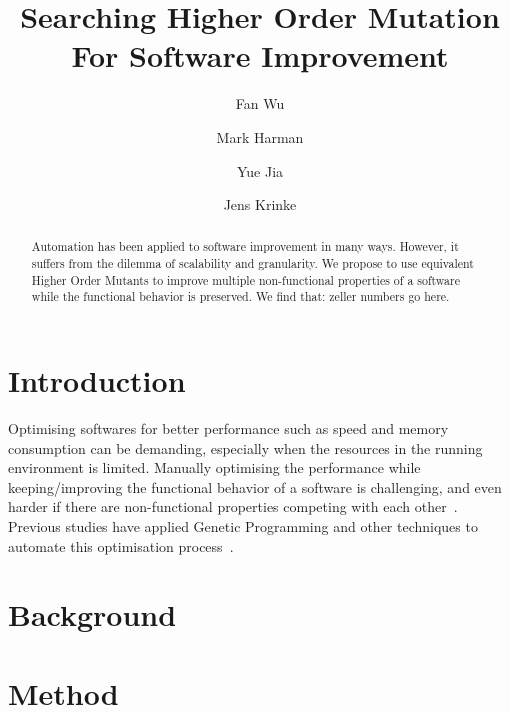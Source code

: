\documentclass[oribibl]{llncs}
\begin{document}
\title{Searching Higher Order Mutation For Software Improvement}

\author{Fan Wu         \and
		Mark Harman        \and
		Yue Jia         \and
		Jens Krinke
}



\maketitle

\begin{abstract}
Automation has been applied to software improvement in many ways.
However, it suffers from the dilemma of scalability and granularity.
We propose to use equivalent Higher Order Mutants to improve multiple non-functional properties of a software while the functional behavior is preserved.
We find that: zeller numbers go here.
\end{abstract}

\section{Introduction}
\label{sec_intro}

Optimising softwares for better performance such as speed and memory consumption can be demanding, especially when the resources in the running environment is limited.
Manually optimising the performance while keeping/improving the functional behavior of a software is challenging, 
and even harder if there are non-functional properties competing with each other~\cite{Harman:2012:GCC:2351676.2351678}.
Previous studies have applied Genetic Programming and other techniques to automate this optimisation process~\cite{6035728, geneticimprovementJP, Wu:2015:DPO:2739480.2754648}.


\section{Background}
\label{sec_back}

\section{Method}
\label{sec_method}
\end{document}
